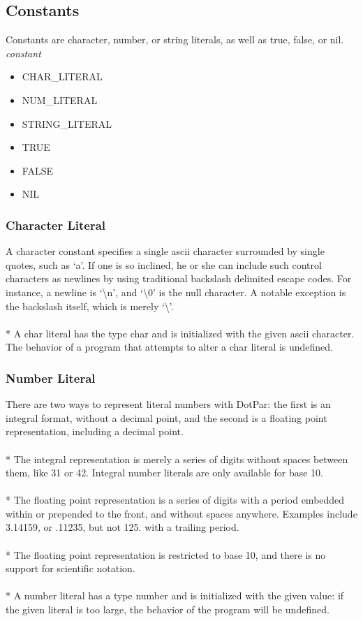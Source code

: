 \subsection{Constants}
Constants are character, number, or string literals, as well as true, false, or nil.
\\ \emph{constant}
\begin{itemize}
\item
CHAR\_LITERAL
\item
NUM\_LITERAL
\item
STRING\_LITERAL
\item
TRUE
\item
FALSE
\item
NIL
\end{itemize}
\subsubsection{Character Literal}
A character constant specifies a single ascii character surrounded by single quotes, such as `a'. If one is so inclined, he or she can include such control characters as newlines by using traditional backslash delimited escape codes. For instance, a newline is `\textbackslash n', and `\textbackslash 0' is the null character. A notable exception is the backslash itself, which is merely `\textbackslash'.
\\ \\* A char literal has the type char and is initialized with the given ascii character. The behavior of a program that attempts to alter a char literal is undefined.
\subsubsection{Number Literal}
There are two ways to represent literal numbers with DotPar: the first is an integral format, without a decimal point, and the second is a floating point representation, including a decimal point.
\\ \\* The integral representation is merely a series of digits without spaces between them, like 31 or 42. Integral number literals are only available for base 10.
\\ \\* The floating point representation is a series of digits with a period embedded within or prepended to the front, and without spaces anywhere. Examples include 3.14159, or .11235, but not 125. with a trailing period.
\\ \\* The floating point representation is restricted to base 10, and there is no support for scientific notation.
\\ \\* A number literal has a type number and is initialized with the given value: if the given literal is too large, the behavior of the program will be undefined.
